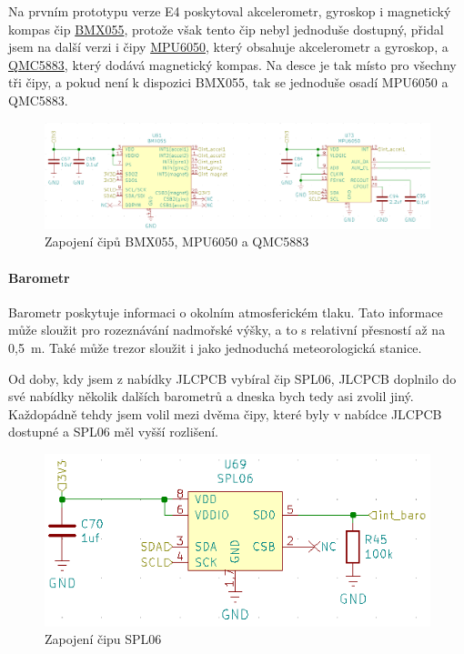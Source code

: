 Na prvním prototypu verze E4 poskytoval akcelerometr, gyroskop i magnetický kompas čip \href{https://datasheet.lcsc.com/szlcsc/Bosch-Sensortec-BMX055_C94022.pdf}{BMX055}, 
protože však tento čip nebyl jednoduše dostupný, přidal jsem na další verzi i čipy \href{https://datasheet.lcsc.com/szlcsc/TDK-InvenSense-MPU-6050_C24112.pdf}{MPU6050},
který obsahuje akcelerometr a gyroskop, a \href{https://datasheet.lcsc.com/szlcsc/QST-QMC5883L-TR_C192585.pdf}{QMC5883}, který dodává magnetický kompas.
Na desce je tak místo pro všechny tři čipy, a pokud není k dispozici BMX055, tak se jednoduše osadí MPU6050 a QMC5883. 

\begin{figure}[htbp]
    \centering
    \includegraphics[width=\textwidth]{kapitoly/obrazky/E4/vnimani/BMX-MPU.png}
    \caption{Zapojení čipů BMX055, MPU6050 a QMC5883}
    \label{fig:E4-9axis}
\end{figure}

\newpage

\paragraph{Barometr}
Barometr poskytuje informaci o okolním atmosferickém tlaku. Tato informace může sloužit pro rozeznávání nadmořské výšky, a to s relativní přesností až na 0,5~m. Také může trezor sloužit 
i jako jednoduchá meteorologická stanice.

Od doby, kdy jsem z nabídky JLCPCB vybíral čip SPL06, JLCPCB doplnilo do své nabídky několik dalších barometrů a dneska bych tedy asi zvolil jiný. Každopádně tehdy jsem volil 
mezi dvěma čipy, které byly v nabídce JLCPCB dostupné a SPL06 měl vyšší rozlišení.

\begin{figure}[htbp]
    \centering
    \includegraphics[width=\textwidth]{kapitoly/obrazky/E4/vnimani/SPL06.png}
    \caption{Zapojení čipu SPL06}
    \label{fig:E4-SPL06}
\end{figure}

